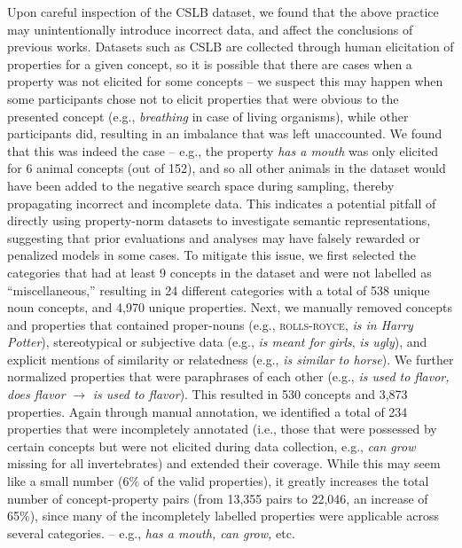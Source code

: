 \documentclass[10pt,letterpaper]{article}
\newcommand{\ake}[1]{\textcolor{blue}{$_{AE}$[#1]}}
\begin{document}
Upon careful inspection of the CSLB dataset, we found that the above practice may unintentionally introduce incorrect data, and affect the conclusions of previous works.
Datasets such as CSLB are collected through human elicitation of properties for a given concept, so it is possible that there are cases when a property was not elicited for some concepts -- we suspect this may happen when some participants chose not to elicit properties that were obvious to the presented concept (e.g., \textit{breathing} in case of living organisms), while other participants did, resulting in an imbalance that was left unaccounted.
We found that this was indeed the case -- e.g., the property \textit{has a mouth} was only elicited for 6 animal concepts (out of 152), and so all other animals in the dataset would have been added to the negative search space during sampling, thereby propagating incorrect and incomplete data. This indicates a potential pitfall of directly using property-norm datasets to investigate semantic representations, suggesting that prior evaluations and analyses \citep{lucy-gauthier-2017-distributional, da-kasai-2019-cracking, bhatia2020transformer} may have falsely rewarded or penalized models in some cases.
To mitigate this issue, we first selected the categories \citep[hand-annotated by][e.g., \textsc{bird, vehicle, tree}, etc.]{devereux2014centre} that had at least 9 concepts in the dataset and were not labelled as ``miscellaneous,'' resulting in 24 different categories with a total of 538 unique noun concepts, and 4{,}970 unique properties.
Next, we manually removed concepts and properties that contained proper-nouns (e.g., \textsc{rolls-royce}, \textit{is in Harry Potter}), stereotypical or subjective data (e.g., \textit{is meant for girls}, \textit{is ugly}), and explicit mentions of similarity or relatedness (e.g., \textit{is similar to horse}). We further normalized properties that were paraphrases of each other (e.g., \textit{is used to flavor, does flavor} $\rightarrow$ \textit{is used to flavor}). This resulted in 530 concepts and  3{,}873 properties.
Again through manual annotation, we identified a total of 234 properties that were incompletely annotated (i.e., those that were possessed by certain concepts but were not elicited during data collection, e.g., \textit{can grow} missing for all invertebrates) and extended their coverage. 
While this may seem like a small number (6\% of the valid properties), it greatly increases the total number of concept-property pairs (from 13{,}355 pairs to 22{,}046, an increase of 65\%), since many of the incompletely labelled properties were applicable across several categories.
-- e.g., \textit{has a mouth, can grow,} etc.
\end{document}
